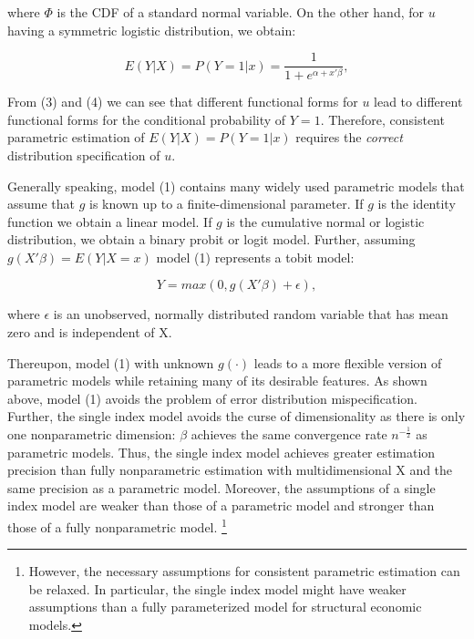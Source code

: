 \documentclass[a4paper]{article}
\begin{document}
where $\Phi$ is the CDF of a standard normal variable. On the other hand, for $u$ having a symmetric logistic distribution, we obtain:

\begin{equation}
E(Y|X) = P(Y=1|x) = \frac{1}{1 + e^{\alpha + x'\beta}},
\end{equation}

From (3) and (4) we can see that different functional forms for $u$ lead to different functional forms for the conditional probability of $Y = 1$. Therefore, consistent parametric estimation of $E(Y|X) = P(Y=1|x)$ requires the \textit{correct} distribution specification of $u$. 

Generally speaking, model (1) contains many widely used parametric models that assume that $g$ is known up to a finite-dimensional parameter. If $g$ is the identity function we obtain a linear model. If $g$ is the cumulative normal or logistic distribution, we obtain a binary probit or logit model. Further, assuming $g(X'\beta) = E(Y|X=x)$ model (1) represents a tobit model:


\[
    Y = max (0, g(X'\beta) + \epsilon),
\]

where $\epsilon$ is an unobserved, normally distributed random variable that has mean zero and is independent of X. 

Thereupon, model (1) with unknown $g(\cdot)$ leads to a more flexible version of parametric models while retaining many of its desirable features. As shown above, model (1) avoids the problem of error distribution mispecification. Further, the single index model avoids the curse of dimensionality as there is only one nonparametric dimension: $\beta$ achieves the same convergence rate $n^{-\frac{1}{2}}$ as parametric models. Thus, the single index model achieves greater estimation precision than fully nonparametric estimation with multidimensional X and the same precision as a parametric model. Moreover, the assumptions of a single index model are weaker than those of a parametric model and stronger than those of a fully nonparametric model.  \footnote{However, the necessary assumptions for consistent parametric estimation can be relaxed. In particular, the single index model might have weaker assumptions than a fully parameterized model for structural economic models.} %


\end{document}
